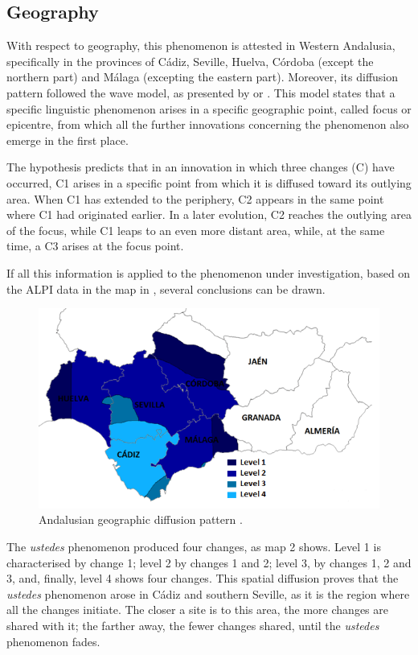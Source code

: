 \documentclass[output=paper]{LSP/langsci}
\begin{document}
\subsection{Geography}
With respect to geography, this phenomenon is attested in Western Andalusia, specifically in the provinces of Cádiz, Seville, Huelva, Córdoba (except the northern part) and Málaga (excepting the eastern part). Moreover, its diffusion pattern followed the wave model, as presented by \citet{chambers_dialectology_1980} or \citet{wolfram_dialectology_2003}. This model states that a specific linguistic phenomenon arises in a specific geographic point, called focus or epicentre, from which all the further innovations concerning the phenomenon also emerge in the first place. 

The hypothesis predicts that in an innovation in which three changes (C) have occurred, C1 arises in a specific point from which it is diffused toward its outlying area. When C1 has extended to the periphery, C2 appears in the same point where C1 had originated earlier. In a later evolution, C2 reaches the outlying area of the focus, while C1 leaps to an even more distant area, while, at the same time, a C3 arises at the focus point.

If all this information is applied to the phenomenon under investigation, based on the ALPI data in the map in , several conclusions can be drawn.

\begin{figure}
\includegraphics[width=\textwidth]{illustrations/lara_fig2}
 \caption{Andalusian geographic diffusion pattern \citep[85]{lara_ustedes_2012}.}
\label{lara_fig2}
\end{figure}

The \textit{ustedes} phenomenon produced four changes, as map 2 shows. Level 1 is characterised by change 1; level 2 by changes 1 and 2; level 3, by changes 1, 2 and 3, and, finally, level 4 shows four changes. This spatial diffusion proves that the \textit{ustedes} phenomenon arose in Cádiz and southern Seville, as it is the region where all the changes initiate. The closer a site is to this area, the more changes are shared with it; the farther away, the fewer changes shared, until the \textit{ustedes} phenomenon fades.  
\end{document}
